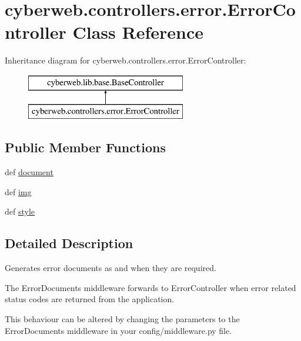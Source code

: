 \hypertarget{classcyberweb_1_1controllers_1_1error_1_1_error_controller}{\section{cyberweb.\-controllers.\-error.\-Error\-Controller \-Class \-Reference}
\label{classcyberweb_1_1controllers_1_1error_1_1_error_controller}
}
\-Inheritance diagram for cyberweb.\-controllers.\-error.\-Error\-Controller\-:\begin{figure}[H]
\begin{center}
\leavevmode
\includegraphics[height=2.000000cm]{classcyberweb_1_1controllers_1_1error_1_1_error_controller}
\end{center}
\end{figure}
\subsection*{\-Public \-Member \-Functions}
\begin{DoxyCompactItemize}
\item 
def \hyperlink{classcyberweb_1_1controllers_1_1error_1_1_error_controller_a897a41bc4cfa9c1d1ee59b1bdd3564bc}{document}
\item 
def \hyperlink{classcyberweb_1_1controllers_1_1error_1_1_error_controller_a9b2b73d22c65056915976c8f4fb204f3}{img}
\item 
def \hyperlink{classcyberweb_1_1controllers_1_1error_1_1_error_controller_afa1969b575c78df76dad61fb32c2ae4f}{style}
\end{DoxyCompactItemize}


\subsection{\-Detailed \-Description}
\begin{DoxyVerb}Generates error documents as and when they are required.

The ErrorDocuments middleware forwards to ErrorController when error
related status codes are returned from the application.

This behaviour can be altered by changing the parameters to the
ErrorDocuments middleware in your config/middleware.py file.

\end{DoxyVerb}
 

